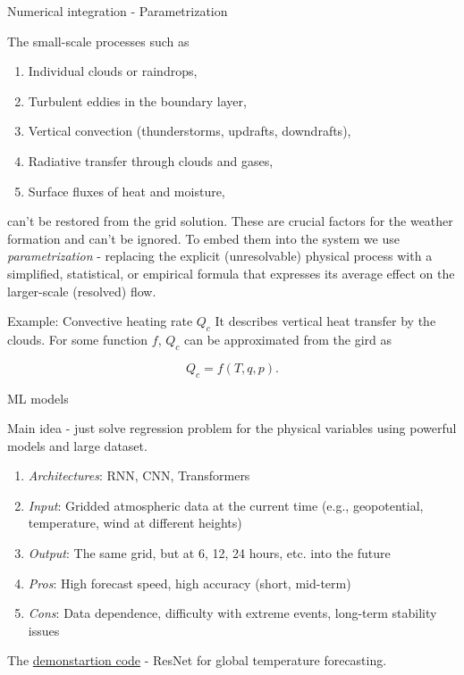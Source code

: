 \documentclass[10pt]{beamer}
\begin{document}
	\begin{frame}{Numerical integration - Parametrization}
		
		The small-scale processes such as
		
		\begin{enumerate}
			\item Individual clouds or raindrops,
			\item Turbulent eddies in the boundary layer,
			\item Vertical convection (thunderstorms, updrafts, downdrafts),
			\item Radiative transfer through clouds and gases,
			\item Surface fluxes of heat and moisture,
		\end{enumerate}
		
		can't be restored from the grid solution. These are crucial factors for the weather formation and can't be ignored. To embed them into the system we use \textit{parametrization} - replacing the explicit (unresolvable) physical process with a simplified, statistical, or empirical formula that expresses its average effect on the larger-scale (resolved) flow.
		
		\begin{exampleblock}{Example: Convective heating rate $Q_c$}
			 It describes vertical heat transfer by the clouds. For some function $f$, $Q_c$ can be approximated from the gird as
			
			\begin{equation*}
				 Q_c = f(T, q, p).
			\end{equation*}
			
		\end{exampleblock}
		
	\end{frame}
	
	\begin{frame}{ML models}
		
		Main idea - just solve regression problem for the physical variables using powerful models and large dataset.
		
		\begin{enumerate}
			\item \textit{Architectures}: RNN, CNN, Transformers
			\item \textit{Input}: Gridded atmospheric data at the current time (e.g., geopotential, temperature, wind at different heights)
			\item \textit{Output}: The same grid, but at 6, 12, 24 hours, etc. into the future
			
			\item \textit{Pros}: High forecast speed, high accuracy (short, mid-term)
			\item \textit{Cons}: Data dependence, difficulty with extreme events, long-term stability issues
		\end{enumerate}
		
		The \href{https://colab.research.google.com/drive/1dQ_V5-y1ieRqrpTG4po_Kx_D8NvZwRyK?usp=sharing\#scrollTo=srfsF01OLV-C}{demonstartion code} - ResNet for global temperature forecasting.
		
	\end{frame}
	
\end{document}
